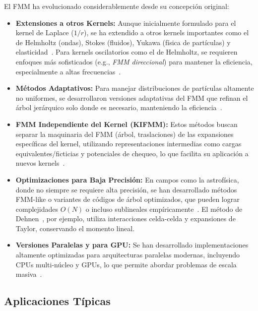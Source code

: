 El FMM ha evolucionado considerablemente desde su concepción original:
\begin{itemize}
    \item \textbf{Extensiones a otros Kernels:} Aunque inicialmente formulado para el kernel de Laplace ($1/r$), se ha extendido a otros kernels importantes como el de Helmholtz (ondas), Stokes (fluidos), Yukawa (física de partículas) y elasticidad~\cite{ChengEtAl1999, Martinsson2012, Rokhlin1990}. Para kernels oscilatorios como el de Helmholtz, se requieren enfoques más sofisticados (e.g., \textit{FMM direccional}) para mantener la eficiencia, especialmente a altas frecuencias~\cite{EngquistYing2009, Rokhlin1990}.
    \item \textbf{Métodos Adaptativos:} Para manejar distribuciones de partículas altamente no uniformes, se desarrollaron versiones adaptativas del FMM que refinan el árbol jerárquico solo donde es necesario, manteniendo la eficiencia~\cite{CarrierEtAl1988, ChengEtAl1999}.
    \item \textbf{FMM Independiente del Kernel (KIFMM):} Estos métodos buscan separar la maquinaria del FMM (árbol, traslaciones) de las expansiones específicas del kernel, utilizando representaciones intermedias como cargas equivalentes/ficticias y potenciales de chequeo, lo que facilita su aplicación a nuevos kernels~\cite{YingEtAl2004, Martinsson2012}.
    \item \textbf{Optimizaciones para Baja Precisión:} En campos como la astrofísica, donde no siempre se requiere alta precisión, se han desarrollado métodos FMM-like o variantes de códigos de árbol optimizados, que pueden lograr complejidades $O(N)$ o incluso sublineales empíricamente~\cite{Dehnen2002}. El método de Dehnen~\cite{Dehnen2002}, por ejemplo, utiliza interacciones celda-celda y expansiones de Taylor, conservando el momento lineal.
    \item \textbf{Versiones Paralelas y para GPU:} Se han desarrollado implementaciones altamente optimizadas para arquitecturas paralelas modernas, incluyendo CPUs multi-núcleo y GPUs, lo que permite abordar problemas de escala masiva~\cite{YokotaBarba2012, Martinsson2012}.
\end{itemize}

\subsection{Aplicaciones Típicas}

